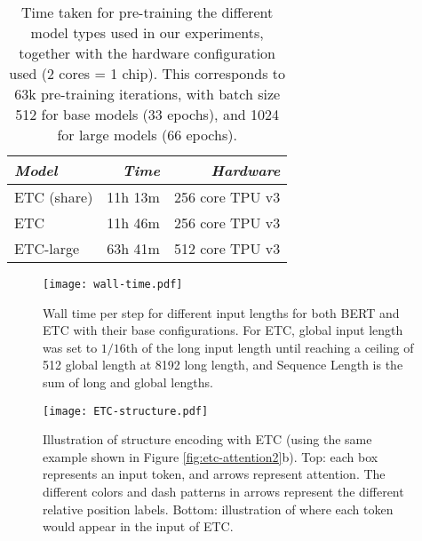 \documentclass[11pt,a4paper]{article}
\begin{document}
\begin{table}[tb]\centering 
\begin{tabular}{lrr} 
{\em Model} & {\em Time} & {\em Hardware}   \\ \hline
ETC (share) & 11h 13m   & 256 core TPU v3 \\
ETC         & 11h 46m   & 256 core TPU v3 \\
ETC-large   & 63h 41m   & 512 core TPU v3 \\
\end{tabular}							
\caption{Time taken for pre-training the different model types used in our experiments, together with the hardware configuration used (2 cores = 1 chip). This corresponds to 63k pre-training iterations, with batch size 512 for base models (33 epochs), and 1024 for large models (66 epochs).}
\label{tbl:times} 
\end{table}

\begin{table}[tb]\centering
{}
\caption{Time taken for fine-tuning the baseline ETC (base) model on different datasets, together with the hardware configuration used (2 cores = 1 chip). As we did a hyper-parameter sweep with different number of epochs, we report the time of the largest number of epochs we tried.}
\label{tbl:times-ft} 
\end{table}

\begin{figure}[t!]
	\texttt{[image: wall-time.pdf]}
	\centering
	\caption{Wall time per step for different input lengths for both BERT and ETC with their base configurations. For ETC, global input length was set to $1/{16}$th of the long input length until reaching a ceiling of 512 global length at 8192 long length, and Sequence Length is the sum of long and global lengths.}
	\label{fig:walltime}
\end{figure}

\begin{figure}[tb]
\texttt{[image: ETC-structure.pdf]}
	\centering
	\caption{Illustration of structure encoding with ETC (using the same example shown in Figure \ref{fig:etc-attention2}b).
	Top: each box represents an input token, and arrows represent attention. The different colors and dash patterns in arrows represent the different relative position labels. Bottom: illustration of where each token would appear in the input of ETC.}
	\label{fig:etc-structure}
\end{figure}
\end{document}

